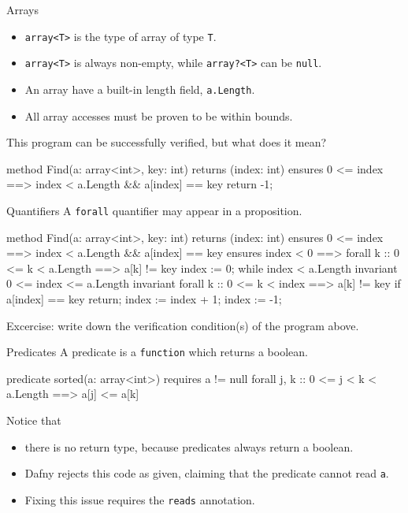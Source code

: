 \documentclass[10pt, compress]{beamer}
\begin{document}
\begin{frame}[fragile]{Arrays}
  \begin{itemize}
  \item \verb|array<T>| is the type of array of type \verb|T|.
  \item \verb|array<T>| is always non-empty, while \verb|array?<T>| can be \verb|null|.
  \item An array have a built-in length field, \verb|a.Length|.
  \item All array accesses must be proven to be within bounds.
  \end{itemize}
  This program can be successfully verified, but what does it mean?
  \begin{verbnobox}[\footnotesize]
method Find(a: array<int>, key: int) returns (index: int)
   ensures 0 <= index ==> index < a.Length && a[index] == key
{
  return -1;
}
  \end{verbnobox}
\end{frame}

\begin{frame}[fragile]{Quantifiers}
  A \verb|forall| quantifier may appear in a proposition.

  \begin{verbnobox}[\scriptsize]
method Find(a: array<int>, key: int) returns (index: int)
   ensures 0 <= index ==> index < a.Length && a[index] == key
   ensures index < 0 ==> forall k :: 0 <= k < a.Length ==> a[k] != key
{
   index := 0;
   while index < a.Length
      invariant 0 <= index <= a.Length
      invariant forall k :: 0 <= k < index ==> a[k] != key
   {
      if a[index] == key { return; }
      index := index + 1;
   }
   index := -1;
}
  \end{verbnobox}
  Excercise: write down the verification condition(s) of the program above.
\end{frame}

\begin{frame}[fragile]{Predicates}
  A predicate is a \verb|function| which returns a boolean. 
  \begin{verbnobox}[\footnotesize]
predicate sorted(a: array<int>)
   requires a != null
{
   forall j, k :: 0 <= j < k < a.Length ==> a[j] <= a[k]
}
  \end{verbnobox}
Notice that
  \begin{itemize}
  \item there is no return type, because predicates always return a boolean.
  \item Dafny rejects this code as given, claiming that the predicate cannot read \verb|a|.
  \item Fixing this issue requires the \verb|reads| annotation.
  \end{itemize}
\end{frame}
\end{document}
